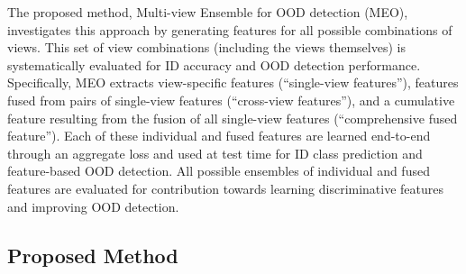 The proposed method, %
Multi-view Ensemble for OOD detection (MEO), investigates this approach by generating features for all possible combinations of views. This set of view combinations (including the views themselves) is systematically evaluated for ID accuracy and OOD detection performance. Specifically, MEO extracts view-specific features (``single-view features''), features fused from pairs of single-view features (``cross-view features''), and a cumulative feature resulting from the fusion of all single-view features (``comprehensive fused feature''). Each of these individual and fused features are learned end-to-end through an aggregate loss and used at test time for ID class prediction and feature-based OOD detection. All possible ensembles of individual and fused features are evaluated for contribution towards learning discriminative features and improving OOD detection.

\subsection{Proposed Method}
\label{sec:propwork-meo-propmeth}



